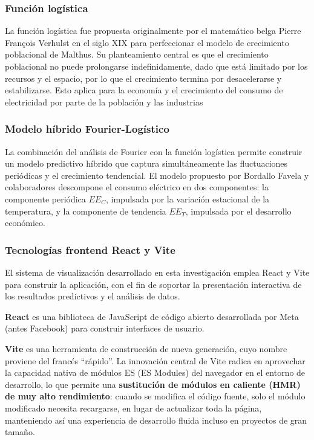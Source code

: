 \subsubsection{Función logística}

La función logística fue propuesta originalmente por el matemático belga Pierre François Verhulst en el siglo XIX para perfeccionar el modelo de crecimiento poblacional de Malthus. Su planteamiento central es que el crecimiento poblacional no puede prolongarse indefinidamente, dado que está limitado por los recursos y el espacio, por lo que el crecimiento termina por desacelerarse y estabilizarse. Esto aplica para la economía y el crecimiento del consumo de electricidad por parte de la población y las industrias

\subsubsection{Modelo híbrido Fourier-Logístico}

La combinación del análisis de Fourier con la función logística permite construir un modelo predictivo híbrido que captura simultáneamente las fluctuaciones periódicas y el crecimiento tendencial. El modelo propuesto por Bordallo Favela y colaboradores descompone el consumo eléctrico en dos componentes: la componente periódica \( EE_C \), impulsada por la variación estacional de la temperatura, y la componente de tendencia \( EE_T \), impulsada por el desarrollo económico.

\subsubsection{Tecnologías frontend React y Vite}

El sistema de visualización desarrollado en esta investigación emplea React y Vite para construir la aplicación, con el fin de soportar la presentación interactiva de los resultados predictivos y el análisis de datos.

\textbf{React} es una biblioteca de JavaScript de código abierto desarrollada por Meta (antes Facebook) para construir interfaces de usuario. 

\textbf{Vite} es una herramienta de construcción de nueva generación, cuyo nombre proviene del francés ``rápido''. La innovación central de Vite radica en aprovechar la capacidad nativa de módulos ES (ES Modules) del navegador en el entorno de desarrollo, lo que permite una \textbf{sustitución de módulos en caliente (HMR) de muy alto rendimiento}: cuando se modifica el código fuente, solo el módulo modificado necesita recargarse, en lugar de actualizar toda la página, manteniendo así una experiencia de desarrollo fluida incluso en proyectos de gran tamaño.